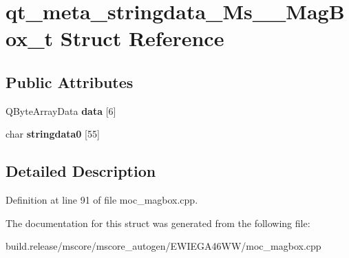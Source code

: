 \hypertarget{structqt__meta__stringdata___ms_____mag_box__t}{}\section{qt\+\_\+meta\+\_\+stringdata\+\_\+\+Ms\+\_\+\+\_\+\+Mag\+Box\+\_\+t Struct Reference}
\label{structqt__meta__stringdata___ms_____mag_box__t}
\subsection*{Public Attributes}
\begin{DoxyCompactItemize}
\item 
\mbox{\label{structqt__meta__stringdata___ms_____mag_box__t_a4326164e85fb8d0f62a48b825c6eccea}} 
Q\+Byte\+Array\+Data {\bfseries data} \mbox{[}6\mbox{]}
\item 
\mbox{\label{structqt__meta__stringdata___ms_____mag_box__t_a81d273bef9e5a6d7a7b767f9189a9704}} 
char {\bfseries stringdata0} \mbox{[}55\mbox{]}
\end{DoxyCompactItemize}


\subsection{Detailed Description}


Definition at line 91 of file moc\+\_\+magbox.\+cpp.



The documentation for this struct was generated from the following file\+:\begin{DoxyCompactItemize}
\item 
build.\+release/mscore/mscore\+\_\+autogen/\+E\+W\+I\+E\+G\+A46\+W\+W/moc\+\_\+magbox.\+cpp\end{DoxyCompactItemize}
